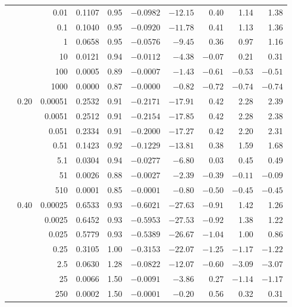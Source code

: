 \begin{table}[htbp]
\begin{tabular}{rrrrrrrrrr}
 &  & 0.01 & 0.1107 & 0.95 & $-0.0982$ & $-12.15$ & 0.40 & 1.14 & 1.38 \\
 &  & 0.1 & 0.1040 & 0.95 & $-0.0920$ & $-11.78$ & 0.41 & 1.13 & 1.36 \\
 &  & 1 & 0.0658 & 0.95 & $-0.0576$ & $-9.45$ & 0.36 & 0.97 & 1.16 \\
 &  & 10 & 0.0121 & 0.94 & $-0.0112$ & $-4.38$ & $-0.07$ & 0.21 & 0.31 \\
 &  & 100 & 0.0005 & 0.89 & $-0.0007$ & $-1.43$ & $-0.61$ & $-0.53$ & $-0.51$ \\
 &  & 1000 & 0.0000 & 0.87 & $-0.0000$ & $-0.82$ & $-0.72$ & $-0.74$ & $-0.74$ \\
\addlinespace
49 & 0.20 & 0.00051 & 0.2532 & 0.91 & $-0.2171$ & $-17.91$ & 0.42 & 2.28 & 2.39 \\
 &  & 0.0051 & 0.2512 & 0.91 & $-0.2154$ & $-17.85$ & 0.42 & 2.28 & 2.38 \\
 &  & 0.051 & 0.2334 & 0.91 & $-0.2000$ & $-17.27$ & 0.42 & 2.20 & 2.31 \\
 &  & 0.51 & 0.1423 & 0.92 & $-0.1229$ & $-13.81$ & 0.38 & 1.59 & 1.68 \\
 &  & 5.1 & 0.0304 & 0.94 & $-0.0277$ & $-6.80$ & 0.03 & 0.45 & 0.49 \\
 &  & 51 & 0.0026 & 0.88 & $-0.0027$ & $-2.39$ & $-0.39$ & $-0.11$ & $-0.09$ \\
 &  & 510 & 0.0001 & 0.85 & $-0.0001$ & $-0.80$ & $-0.50$ & $-0.45$ & $-0.45$ \\
\addlinespace
99 & 0.40 & 0.00025 & 0.6533 & 0.93 & $-0.6021$ & $-27.63$ & $-0.91$ & 1.42 & 1.26 \\
 &  & 0.0025 & 0.6452 & 0.93 & $-0.5953$ & $-27.53$ & $-0.92$ & 1.38 & 1.22 \\
 &  & 0.025 & 0.5779 & 0.93 & $-0.5389$ & $-26.67$ & $-1.04$ & 1.00 & 0.86 \\
 &  & 0.25 & 0.3105 & 1.00 & $-0.3153$ & $-22.07$ & $-1.25$ & $-1.17$ & $-1.22$ \\
 &  & 2.5 & 0.0630 & 1.28 & $-0.0822$ & $-12.07$ & $-0.60$ & $-3.09$ & $-3.07$ \\
 &  & 25 & 0.0066 & 1.50 & $-0.0091$ & $-3.86$ & 0.27 & $-1.14$ & $-1.17$ \\
 &  & 250 & 0.0002 & 1.50 & $-0.0001$ & $-0.20$ & 0.56 & 0.32 & 0.31 \\
\bottomrule
\end{tabular}
\end{table}
